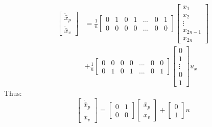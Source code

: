 \begin{align}
\begin{bmatrix}\nonumber
\dot{\bar{x}}_p \\
\dot{\bar{x}}_v
\end{bmatrix} &= \frac{1}{n} \begin{bmatrix}
0& 1& 0& 1& ... &0& 1 \\
0& 0& 0& 0& ... &0& 0
\end{bmatrix}
\begin{bmatrix}
x_1\\
x_2\\
\vdots\\
x_{2n-1}\\
x_{2n}
\end{bmatrix} \\
&+ \frac{1}{n}\begin{bmatrix}
0& 0& 0& 0& ... &0& 0 \\
0& 1& 0& 1& ... &0& 1
\end{bmatrix}\begin{bmatrix} 
0\\
1\\
\vdots\\
0\\
1
\end{bmatrix} u_x
\end{align}
Thus:
\begin{equation}
\begin{bmatrix}
\dot{\bar{x}}_p \\
\dot{\bar{x}}_v
\end{bmatrix} = \begin{bmatrix}
0& 1 \\
0& 0
\end{bmatrix}
\begin{bmatrix}
\bar{x}_p\\
\bar{x}_v
\end{bmatrix} + \begin{bmatrix} 
0\\
1
\end{bmatrix} u
\end{equation}

